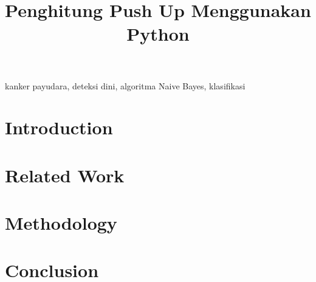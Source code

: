 \documentclass[conference]{IEEEtran}
\begin{document}
\title{Penghitung Push Up Menggunakan Python}

\author{
}
\maketitle

\begin{abstract}

\end{abstract}

\begin{IEEEkeywords}
kanker payudara, deteksi dini, algoritma Naive Bayes, klasifikasi
\end{IEEEkeywords}

\section{Introduction} \label{sec:introduction}

\section{Related Work} \label{sec:related-work}

\section{Methodology} \label{sec:methodology}

\section{Conclusion} \label{sec:conclusion}




\end{document}
